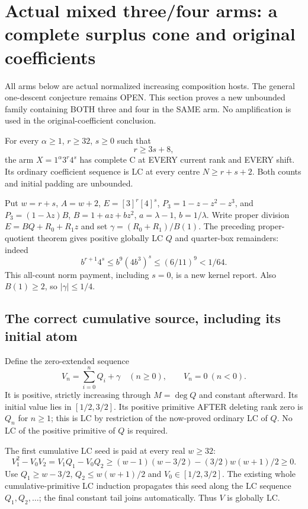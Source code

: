 \section{Actual mixed three/four arms: a complete surplus cone and original coefficients}
All arms below are actual normalized increasing composition hosts.
The general one-descent conjecture remains OPEN. This section proves
a new unbounded family containing BOTH three and four in the SAME arm.
No amplification is used in the original-coefficient conclusion.

\begin{theorem}
For every $\alpha\ge1$, $r\ge32$, $s\ge0$ such that
\[
                             r\ge3s+8,                    \tag{1}
\]
the arm $X=1^\alpha3^r4^s$ has complete C at EVERY current rank and
EVERY shift. Its ordinary coefficient sequence is LC at every centre
$N\ge r+s+2$. Both counts and initial padding are unbounded.
\end{theorem}

Put $w=r+s$, $A=w+2$, $E=[3]^r[4]^s$, $P_3=1-z-z^2-z^3$,
and $P_3=(1-\lambda z)B$, $B=1+az+bz^2$,
$a=\lambda-1$, $b=1/\lambda$. Write proper division
$E=BQ+R_0+R_1z$ and set $\gamma=(R_0+R_1)/B(1)$.
The preceding proper-quotient theorem gives positive globally LC $Q$
and quarter-box remainders: indeed
\[
 b^{r+1}4^s\le b^9(4b^3)^s\le(6/11)^9<1/64.
\]
This all-count norm payment, including $s=0$, is a new kernel report.
Also $B(1)\ge2$, so $|\gamma|\le1/4$.

\subsection{The correct cumulative source, including its initial atom}
Define the zero-extended sequence
\[
 V_n=\sum_{i=0}^nQ_i+\gamma\quad(n\ge0),\qquad V_n=0\ (n<0).
\]
It is positive, strictly increasing through $M=\deg Q$ and constant
afterward. Its initial value lies in $[1/2,3/2]$.
Its positive primitive AFTER deleting rank zero is $Q_n$ for $n\ge1$;
this is LC by restriction of the now-proved ordinary LC of $Q$.
No LC of the positive primitive of $Q$ is required.

The first cumulative LC seed is paid at every real $w\ge32$:
\[
 V_1^2-V_0V_2=V_1Q_1-V_0Q_2
 \ge(w-1)(w-3/2)-(3/2)w(w+1)/2\ge0.
\]
Use $Q_1\ge w-3/2$, $Q_2\le w(w+1)/2$ and $V_0\in[1/2,3/2]$.
The existing whole cumulative-primitive LC induction propagates this
seed along the LC sequence $Q_1,Q_2,\ldots$; the final constant tail
joins automatically. Thus $V$ is globally LC.

